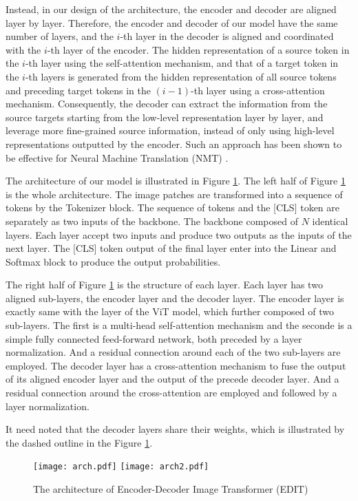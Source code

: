 \documentclass[anon,12pt]{colt2024} %
\begin{document}
Instead, in our design of the architecture, the encoder and decoder are aligned layer by layer.
Therefore, the encoder and decoder of our model have the same number of layers, and the $i$-th layer in the decoder is aligned and coordinated with the $i$-th layer of the encoder.
The hidden representation of a source token in the $i$-th layer using the self-attention mechanism, and that of a target token in the $i$-th layers is generated from the hidden representation of all source tokens and preceding target tokens in the $(i-1)$-th layer using a cross-attention mechanism.
Consequently, the decoder can extract the information from the source targets starting from the low-level representation layer by layer, and leverage more fine-grained source information, instead of only using high-level representations outputted by the encoder. Such an approach has been shown to be effective for Neural Machine Translation (NMT) \cite{he2018layer}.

The architecture of our model is illustrated in Figure \ref{fig1}.
The left half of Figure \ref{fig1} is the whole architecture. The image patches are transformed into a sequence of tokens by the Tokenizer block. The sequence of tokens and the [CLS] token are separately as two inputs of the backbone. The backbone composed of $N$ identical layers. Each layer accept two inputs and produce two outputs as the inputs of the next layer. The [CLS] token output of the final layer enter into the Linear and Softmax block to produce the output probabilities.

The right half of Figure \ref{fig1} is the structure of each layer. Each layer has two aligned sub-layers, the encoder layer and the decoder layer. The encoder layer is exactly same with the layer of the ViT model, which further composed of two sub-layers. The first is a multi-head self-attention mechanism and the seconde is a simple fully connected feed-forward network, both preceded by a layer normalization. And a residual connection around each of the two sub-layers are employed. The decoder layer has a cross-attention mechanism to fuse the output of its aligned encoder layer and the output of the precede decoder layer. And a residual connection around the cross-attention are employed and  followed by a layer normalization. 

It need noted that the decoder layers share their weights, which is illustrated by the dashed outline in the  Figure \ref{fig1}.


\begin{figure}[h]
  \centering
  \texttt{[image: arch.pdf]}
  \texttt{[image: arch2.pdf]}
  \caption{The architecture of Encoder-Decoder Image Transformer (EDIT)}\label{fig1}
\end{figure}
  
\end{document}
